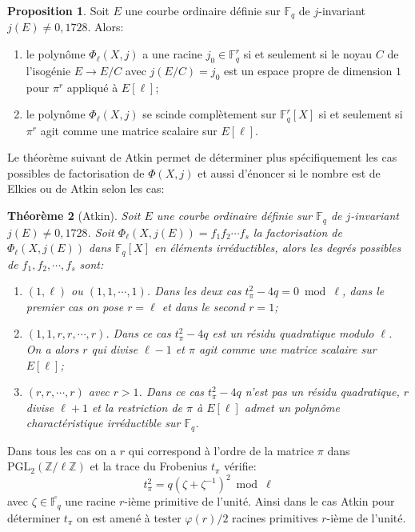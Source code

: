 \documentclass[10pt,a4paper]{book}
\theoremstyle{plain}
\newtheorem{thm}{Théorème}[chapter]
\theoremstyle{definition}
\theoremstyle{definition}
\theoremstyle{definition}
\newtheorem{prop}[thm]{Proposition}
\theoremstyle{definition}
\theoremstyle{remark}
\theoremstyle{remark}
\theoremstyle{definition}
\begin{document}


\begin{prop}\label{pro:def-ss-grp}
Soit $E$ une courbe ordinaire définie sur $\mathbb{F}_q$ de $j$-invariant $j(E) \neq 0, 1728$. Alors:
\begin{enumerate}
\item le polynôme $\Phi_{\ell}(X,j)$ a une racine $j_0 \in \mathbb{F}_{q}^r$ si et seulement si le noyau $C$ de l'isogénie $E \to E/C$ avec $j(E/C)=j_0$ est un espace propre de dimension $1$ pour $\pi^r$ appliqué à $E[\ell]$;
\item le polynôme $\Phi_{\ell}(X,j)$ se scinde complètement sur $ \mathbb{F}_{q}^r[X]$ si et seulement si $\pi^r$ agit comme une matrice scalaire sur $E[\ell]$.
\end{enumerate}
\end{prop}

Le théorème suivant de Atkin permet de déterminer plus spécifiquement les cas possibles de factorisation de $\Phi(X,j)$  et aussi d'énoncer si le nombre est de Elkies ou de Atkin selon les cas:

\begin{thm}[Atkin]\label{thm:Atkin}
Soit $E$ une courbe ordinaire définie sur $\mathbb{F}_q$ de $j$-invariant $j(E) \neq 0, 1728$. Soit $\Phi_{\ell}(X,j(E))=f_1f_2\cdots f_s$ la factorisation de $\Phi_{\ell}(X,j(E))$ dans $\mathbb{F}_q[X]$ en éléments irréductibles, alors les degrés possibles de $f_1,f_2, \cdots , f_s$ sont:
\begin{enumerate}
\item $(1,\ell)$ ou $(1,1, \cdots, 1)$. Dans les deux cas $t_{\pi}^2-4q=0 \bmod \ell $, dans le premier cas on pose $r=\ell$ et dans le second $r=1$;
\item $(1,1,r,r, \cdots,r)$. Dans ce cas $t_{\pi}^2-4q$ est un résidu quadratique modulo $\ell$. On a alors $r$ qui divise $\ell-1$ et $\pi$ agit comme une matrice scalaire sur $E[\ell]$;
\item $(r,r,\cdots,r)$ avec $r>1$. Dans ce cas $t_{\pi}^2-4q$ n'est pas un résidu quadratique, $r$ divise $\ell+1$ et la restriction de $\pi$ à $E[\ell]$ admet un polynôme charactéristique irréductible sur $\mathbb{F}_q$. 
\end{enumerate}
\end{thm}
Dans tous les cas on a $r$ qui correspond à l'ordre de la matrice $\pi$ dans $\mathrm{PGL_2}(\mathbb{Z}/\ell \mathbb{Z})$ et la trace du Frobenius $t_{\pi}$ vérifie:
\begin{equation}
\label{eq:sea:tra}
t_{\pi}^2=q(\zeta + \zeta^{-1})^2 \bmod \ell
\end{equation}
avec $\zeta \in \overline{\mathbb{F}_q}$ une racine $r$-ième primitive de l'unité. Ainsi dans le cas Atkin pour déterminer $t_{\pi}$ on est amené à tester $\varphi(r)/2$ racines primitives $r$-ième de l'unité.
\end{document}
